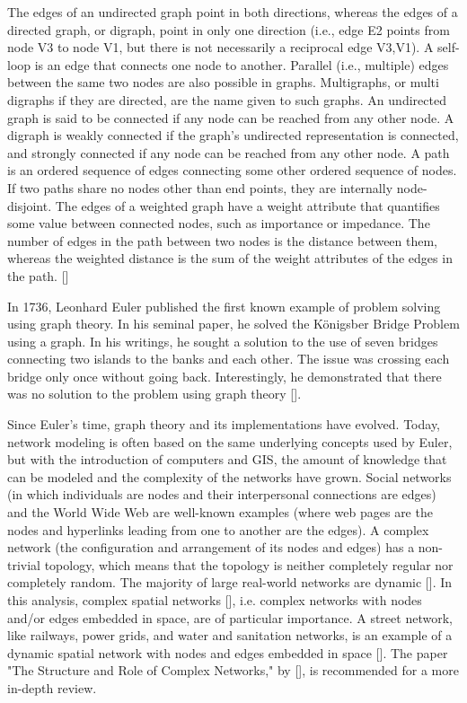 The edges of an undirected graph point in both directions, whereas the edges of a directed graph, or digraph, point in only one direction (i.e., edge E2 points from node V3 to node V1, but there is not necessarily a reciprocal edge V3,V1). A self-loop is an edge that connects one node to another. Parallel (i.e., multiple) edges between the same two nodes are also possible in graphs. Multigraphs, or multi digraphs if they are directed, are the name given to such graphs. An undirected graph is said to be connected if any node can be reached from any other node. A digraph is weakly connected if the graph's undirected representation is connected, and strongly connected if any node can be reached from any other node. A path is an ordered sequence of edges connecting some other ordered sequence of nodes. If two paths share no nodes other than end points, they are internally node-disjoint. The edges of a weighted graph have a weight attribute that quantifies some value between connected nodes, such as importance or impedance. The number of edges in the path between two nodes is the distance between them, whereas the weighted distance is the sum of the weight attributes of the edges in the path. [\cite{Boeing:2017}]

In 1736, Leonhard Euler published the first known example of problem solving using graph theory. In his seminal paper, he solved the Königsber Bridge Problem using a graph. In his writings, he sought a solution to the use of seven bridges connecting two islands to the banks and each other. The issue was crossing each bridge only once without going back. Interestingly, he demonstrated that there was no solution to the problem using graph theory [\cite{Duo:2002}]. 

Since Euler's time, graph theory and its implementations have evolved. Today, network modeling is often based on the same underlying concepts used by Euler, but with the introduction of computers and GIS, the amount of knowledge that can be modeled and the complexity of the networks have grown. Social networks (in which individuals are nodes and their interpersonal connections are edges) and the World Wide Web are well-known examples (where web pages are the nodes and hyperlinks leading from one to another are the edges). A complex network (the configuration and arrangement of its nodes and edges) has a non-trivial topology, which means that the topology is neither completely regular nor completely random. The majority of large real-world networks are dynamic [\cite{Newman:2010}]. In this analysis, complex spatial networks [\cite{OSullivan:2014}], i.e. complex networks with nodes and/or edges embedded in space, are of particular importance. A street network, like railways, power grids, and water and sanitation networks, is an example of a dynamic spatial network with nodes and edges embedded in space [\cite{Barthelemy:2011}]. The paper "The Structure and Role of Complex Networks," by [\cite{Newman:2003}], is recommended for a more in-depth review.

